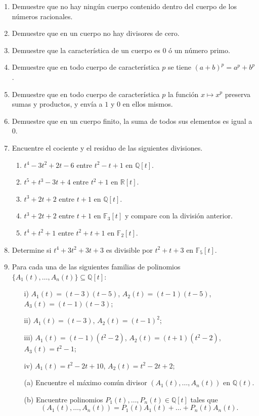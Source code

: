 \begin{enumerate}
\item Demuestre que no hay ningún cuerpo contenido dentro del cuerpo de los números racionales.

\item Demuestre que en un cuerpo no hay divisores de cero.

\item Demuestre que la característica de un cuerpo es $0$ ó un número primo.

\item Demuestre que en todo cuerpo de característica $p$ se tiene $(a+b)^p=a^p+b^p$.

\item Demuestre que en todo cuerpo de característica $p$ la función $x\mapsto x^p$ preserva sumas y productos, y envía a $1$ y $0$ en ellos mismos.

\item Demuestre que en un cuerpo finito, la suma de todos sus elementos es igual a $0$.

\item Encuentre el cociente y el residuo de las siguientes divisiones.
  \begin{enumerate}
    \item $t^4-3t^2+2t-6$ entre $t^2-t+1$ en $\mathbb{Q}[t]$.
    \item $t^5+t^3-3t+4$ entre $t^2+1$ en $\mathbb{R}[t]$.
    \item $t^3+2t+2$ entre $t+1$ en $\mathbb{Q}[t]$.
    \item $t^3+2t+2$ entre $t+1$ en $\mathbb{F}_3[t]$ y compare con la división anterior.
    \item $t^4+t^2+1$ entre $t^2+t+1$ en $\mathbb{F}_2[t]$.
  \end{enumerate}
\item Determine si $t^4+3t^2+3t+3$ es divisible por $t^2+t+3$ en $\mathbb{F}_5[t]$.

\item Para cada una de las siguientes familias de polinomios $\{A_1(t),\ldots,A_n(t)\}\subseteq\mathbb{Q}[t]$:
\begin{itemize}
\item[i)] $A_1(t)=(t-3)(t-5)$, $A_2(t)=(t-1)(t-5)$, $A_3(t)=(t-1)(t-3)$;
\item[ii)] $A_1(t)=(t-3)$, $A_2(t)=(t-1)^2$;
\item[iii)] $A_1(t)=(t-1)(t^2-2)$, $A_2(t)=(t+1)(t^2-2)$, $A_3(t)=t^2-1$;
\item[iv)] $A_1(t)=t^2-2t+10$, $A_2(t)=t^2-2t+2$;
\end{itemize}
\begin{itemize}
\item[(a)] Encuentre el máximo común divisor $\left(A_1(t),\ldots,A_n(t)\right)$ en $\mathbb{Q}(t)$.
\item[(b)] Encuentre polinomios $P_1(t),\ldots,P_n(t)\in\mathbb{Q}[t]$ tales que
$$\left(A_1(t),\ldots,A_n(t)\right)=P_1(t)A_1(t)+\ldots+P_n(t)A_n(t).$$
\end{itemize}


\end{enumerate}
